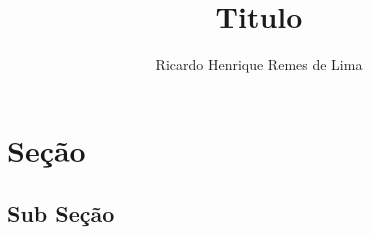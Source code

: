 \documentclass[12pt]{article}
\title{Titulo}
\author{Ricardo Henrique Remes de Lima}
\begin{document}
 

\maketitle


\section{Seção}


\subsection{Sub Seção}
\end{document}
